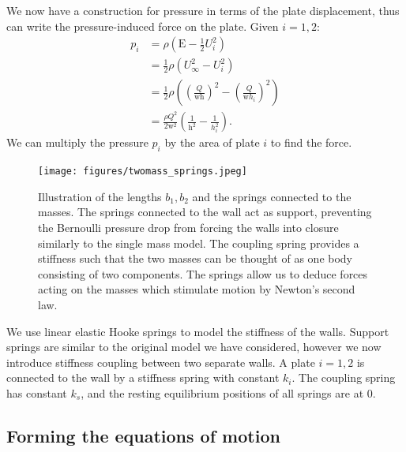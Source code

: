 \documentclass{report}
\begin{document}
We now have a construction for pressure in terms of the plate displacement, thus can write the pressure-induced force on the plate.
Given \(i=1,2:\)
\begin{equation}
    \begin{aligned}
        p_i &= \rho\left(\mathrm{E} - \frac{1}{2}U_i^2 \right) \\
        &= \frac{1}{2}\rho\left(U_\infty^2 - U_i^2\right) \\
        &= \frac{1}{2}\rho\left( \left(\frac{Q}{\mathrm{wh}}\right)^2 - \left(\frac{Q}{\mathrm{w}h_i}\right)^2 \right) \\
        &= \frac{\rho Q^2}{2\mathrm{w}^2}\left( \frac{1}{\mathrm{h}^2} - \frac{1}{h_i^2} \right).
    \end{aligned}
    \label{eqn:twomass_pressureterm}
\end{equation}
We can multiply the pressure $p_i$ by the area of plate $i$ to find the force.

\begin{figure}
    \centering
    \texttt{[image: figures/twomass\_springs.jpeg]}
    \caption
    {
        Illustration of the lengths $b_1,b_2$ and the springs connected to the masses.
        The springs connected to the wall act as support,
        preventing the Bernoulli pressure drop from forcing the walls into closure similarly to the single mass model.
        The coupling spring provides a stiffness such that the two masses can be thought of as one body consisting of two components.
        The springs allow us to deduce forces acting on the masses which stimulate motion by Newton's second law. 
    }
    \label{fig:twomass_springs}
\end{figure}

We use linear elastic Hooke springs to model the stiffness of the walls.
Support springs are similar to the original model we have considered,
however we now introduce stiffness coupling between two separate walls.
A plate $i = 1,2$ is connected to the wall by a stiffness spring with constant ${k}_i$.
The coupling spring has constant $k_s$, and the resting equilibrium positions of all springs are at $0$.

\subsection{Forming the equations of motion}
\end{document}
